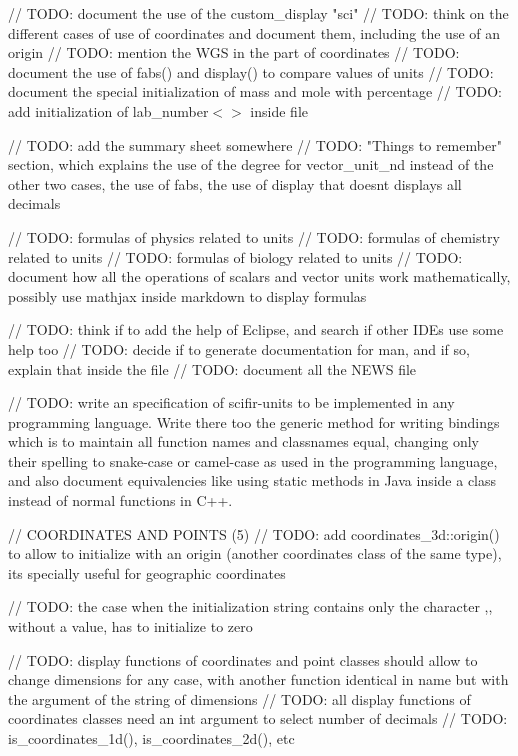 // TODO\+: document the use of the custom\+\_\+display "{}sci"{} // TODO\+: think on the different cases of use of coordinates and document them, including the use of an origin // TODO\+: mention the WGS in the part of coordinates // TODO\+: document the use of fabs() and display() to compare values of units // TODO\+: document the special initialization of mass and mole with percentage // TODO\+: add initialization of lab\+\_\+number$<$$>$ inside  file

// TODO\+: add the summary sheet somewhere // TODO\+: "{}\+Things to remember"{} section, which explains the use of the degree for vector\+\_\+unit\+\_\+nd instead of the other two cases, the use of fabs, the use of display that doesn\textquotesingle{}t displays all decimals

// TODO\+: formulas of physics related to units // TODO\+: formulas of chemistry related to units // TODO\+: formulas of biology related to units // TODO\+: document how all the operations of scalars and vector units work mathematically, possibly use mathjax inside markdown to display formulas

// TODO\+: think if to add the help of Eclipse, and search if other IDEs use some help too // TODO\+: decide if to generate documentation for man, and if so, explain that inside the  file // TODO\+: document all the NEWS file

// TODO\+: write an specification of scifir-\/units to be implemented in any programming language. Write there too the generic method for writing bindings which is to maintain all function names and classnames equal, changing only their spelling to snake-\/case or camel-\/case as used in the programming language, and also document equivalencies like using static methods in Java inside a class instead of normal functions in C++.

// COORDINATES AND POINTS (5) // TODO\+: add coordinates\+\_\+3d\+::origin() to allow to initialize with an origin (another coordinates class of the same type), it\textquotesingle{}s specially useful for geographic coordinates

// TODO\+: the case when the initialization string contains only the character \textquotesingle{},\textquotesingle{}, without a value, has to initialize to zero

// TODO\+: display functions of coordinates and point classes should allow to change dimensions for any case, with another function identical in name but with the argument of the string of dimensions // TODO\+: all display functions of coordinates classes need an int argument to select number of decimals // TODO\+: is\+\_\+coordinates\+\_\+1d(), is\+\_\+coordinates\+\_\+2d(), etc

